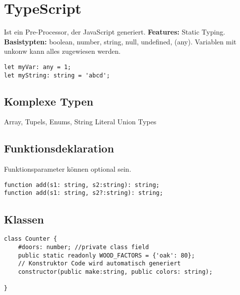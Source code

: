 
\section{TypeScript}
Ist ein Pre-Processor, der JavaScript generiert. \textbf{Features:} Static Typing. \textbf{Basistypten:} boolean, number, string, null, undefined, (any). Variablen mit unkonw kann alles zugewiesen werden.

\begin{lstlisting}[style=JS]
let myVar: any = 1;
let myString: string = 'abcd';
\end{lstlisting}

\subsection{Komplexe Typen}
Array, Tupels, Enums, String Literal Union Types

\subsection{Funktionsdeklaration}
Funktionsparameter können optional sein.
\begin{lstlisting}[style=JS]
function add(s1: string, s2:string): string;
function add(s1: string, s2?:string): string; 
\end{lstlisting}

\subsection{Klassen}
\begin{lstlisting}[style=JS]
class Counter {
	#doors: number; //private class field
	public static readonly WOOD_FACTORS = {'oak': 80};
	// Konstruktor Code wird automatisch generiert
	constructor(public make:string, public colors: string); 

}
\end{lstlisting}

